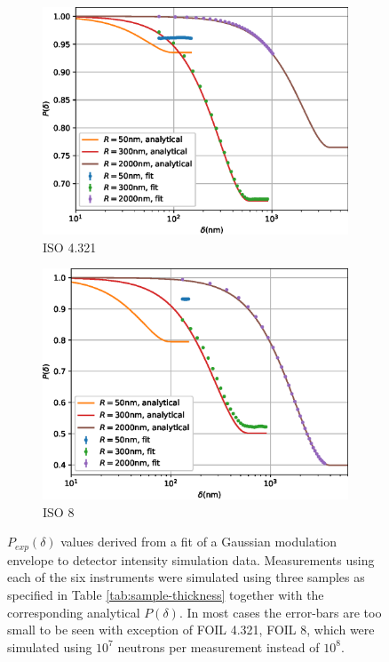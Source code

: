 \begin{figure}[p]
\begin{subfigure}[b]{0.45\textwidth}
		\includegraphics[width=\textwidth]{simulation-plot-gauss-ISO-4.321}
		\caption{ISO 4.321}
		\label{fig:simulation-plot-gauss-ISO-4.321}
	\end{subfigure}
	\hfill
	\begin{subfigure}[b]{0.45\textwidth}
		\centering
		\includegraphics[width=\textwidth]{simulation-plot-gauss-ISO-8}
		\caption{ISO 8}
		\label{fig:simulation-plot-gauss-ISO-8}
	\end{subfigure}
	\caption{$P_{exp}(\delta)$ values derived from a fit of a Gaussian modulation envelope to detector intensity simulation data. Measurements using each of the six instruments were simulated using three samples as specified in Table \ref{tab:sample-thickness} together with the corresponding analytical $P(\delta)$. In most cases the error-bars are too small to be seen with exception of FOIL 4.321, FOIL 8, which were simulated using $10^7$ neutrons per measurement instead of $10^8$.}
	\label{fig:simulation-plot-gauss}
\end{figure}

